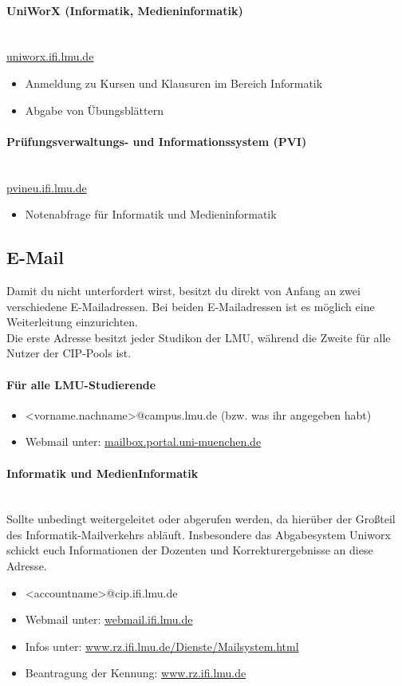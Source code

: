 \paragraph{UniWorX (Informatik, Medieninformatik)}\hfill\\
\url{uniworx.ifi.lmu.de}
\begin{itemize}
	\item Anmeldung zu Kursen und Klausuren im Bereich Informatik
	\item Abgabe von Übungsblättern
\end{itemize}

\paragraph{Prüfungsverwaltungs- und Informationssystem (PVI)\subjectList{\subjectP}}\hfill\\
\url{pvineu.ifi.lmu.de}
\begin{itemize}
	\item Notenabfrage für Informatik und Medieninformatik
\end{itemize}

\clearpage

\subsection{E-Mail}
Damit du nicht unterfordert wirst, besitzt du direkt von Anfang an zwei verschiedene E-Mailadressen. Bei beiden E-Mailadressen ist es möglich eine Weiterleitung einzurichten.\\

Die erste Adresse besitzt jeder Studikon der LMU, während die Zweite für alle Nutzer der CIP-Pools ist.

\paragraph{Für alle LMU-Studierende}
\begin{itemize}
	\item <vorname.nachname>@campus.lmu.de (bzw. was ihr angegeben habt)
	\item Webmail unter: \url{mailbox.portal.uni-muenchen.de}
\end{itemize}

\paragraph{Informatik und MedienInformatik}\hfill\\
Sollte unbedingt weitergeleitet oder abgerufen werden, da hierüber der Großteil des Informatik-Mailverkehrs abläuft. Insbesondere das Abgabesystem Uniworx schickt euch Informationen der Dozenten und Korrekturergebnisse an diese Adresse.
\begin{itemize}
	\item <accountname>@cip.ifi.lmu.de
	\item Webmail unter: \url{webmail.ifi.lmu.de}
	\item Infos unter: \url{www.rz.ifi.lmu.de/Dienste/Mailsystem.html}
	\item Beantragung der Kennung: \url{www.rz.ifi.lmu.de}
\end{itemize}

